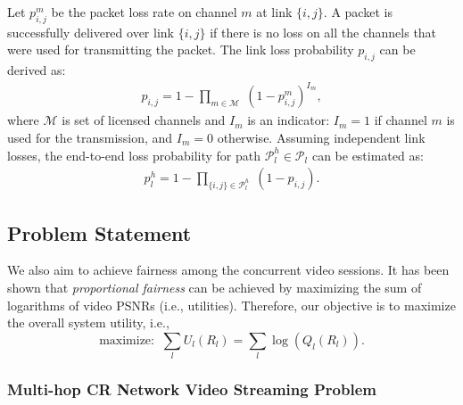 \documentclass[12pt,onecolumn,draftclsnofoot]{IEEEtran} %
\begin{document}
Let $p_{i,j}^m$ be the packet loss rate on channel $m$ at link $\{i,j\}$.  A packet is successfully delivered over link $\{i,j\}$ if there is no loss on all the channels that were used for transmitting the packet.  The link loss probability $p_{i,j}$ can be derived as:
\begin{eqnarray}\label{eq:LinkLoss}
  p_{i,j} = 1 - \prod_{m \in \mathcal{M}} 
            \; (1-p_{i,j}^m)^{I_m},
\end{eqnarray}
where $\mathcal{M}$ is set of licensed channels and $I_m$ is an indicator: $I_m = 1$ if channel $m$ is used for the transmission, and $I_m = 0$ otherwise.  Assuming independent link losses, the end-to-end loss probability for path $\mathcal{P}_l^h \in \mathcal{P}_l$ can be estimated as:
\begin{eqnarray}\label{eq:PathLoss}
  p_l^h = 1 - \prod_{\{i,j\}\in \mathcal{P}_l^h} \; (1-p_{i,j}).
\end{eqnarray}


\subsection{Problem Statement}

We also aim to achieve fairness among the concurrent video sessions. It has been shown that {\em proportional fairness} can be achieved by maximizing the sum of logarithms of video PSNRs (i.e., utilities). Therefore, our objective is to maximize the overall system utility, i.e.,
\begin{equation}\label{eq:MaxQ}
  \mbox{maximize:} \;\; \sum_l U_l(R_l) = \sum_l \log (Q_l(R_l)). 
\end{equation}


\subsubsection{Multi-hop CR Network Video Streaming Problem}
\end{document}
